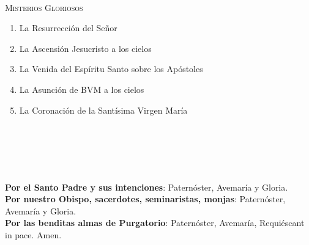 \documentclass[9pt]{article}
\begin{document}
\begin{multicols*}{2}
    \vspace{2mm}

    \small{}\\
    \textsc{Misterios Gloriosos}
    \begin{enumerate}
        \item La Resurrección del Señor
        \item La Ascensión Jesucristo a los cielos
        \item La Venida del Espíritu Santo sobre los Apóstoles
        \item La Asunción de BVM a los cielos
        \item La Coronación de la Santísima Virgen María
    \end{enumerate}

    \vspace{2mm}

    \\[1mm]
    \\[1mm]
    \\[1mm]
    

    \vspace{2mm}

    \\

    \textbf{Por el Santo Padre y sus intenciones}: Paternóster, Avemaría y Gloria.\\[1mm]
    \textbf{Por nuestro Obispo, sacerdotes, seminaristas, monjas}: Paternóster, Avemaría y Gloria.\\[1mm]
    \textbf{Por las benditas almas de Purgatorio}: Paternóster, Avemaría, Requiéscant in pace. Amen.\\

    \\
    \\
    \\
    \\[2mm]
    \\
    \\[1mm]
    \\[1mm]
    


    \\
    \\
    \\
    

\end{multicols*}
\end{document}
